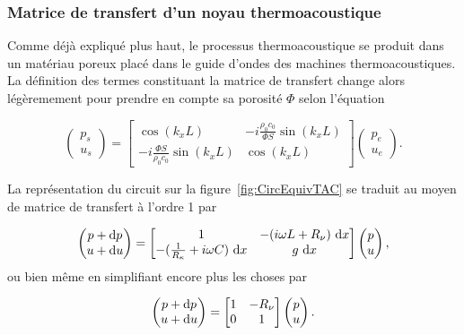 \subsubsection{Matrice de transfert d'un noyau thermoacoustique}

Comme déjà expliqué plus haut, le processus thermoacoustique se produit dans un matériau poreux placé dans le guide d'ondes des machines thermoacoustiques. La définition des termes constituant la matrice de transfert change alors légèremement pour prendre en compte sa porosité $\Phi$ selon l'équation

\begin{equation}
\begin{pmatrix}
p_s\\
u_s
\end{pmatrix} = \begin{bmatrix}
\cos(k_x L) & -i\frac{\rho_0 c_0}{\Phi S}\sin(k_x L)\\
-i\frac{\Phi S}{\rho_0 c_0}\sin(k_x L) & \cos(k_x L)
\end{bmatrix}
\begin{pmatrix}
p_e\\
u_e
\end{pmatrix}.\label{eq:Tmatrix_poreux}
\end{equation}


La représentation du circuit sur la figure~\ref{fig:CircEquivTAC} se traduit au moyen de matrice de transfert à l'ordre 1 par 


\begin{equation}
	\begin{pmatrix}
		p + \mathrm{d} p\\
		u + \mathrm{d} u
	\end{pmatrix} = \begin{bmatrix}
	1 & -(i\omega L + R_\nu)~\mathrm{d} x  \\
	-(\frac{1}{R_\kappa} + i \omega C)~\mathrm{d} x & g~\mathrm{d} x \end{bmatrix} \begin{pmatrix}
	p \\
	u
	\end{pmatrix}, \label{eq:TMatrix_NoyauTA}
\end{equation}
ou bien même en simplifiant encore plus les choses par

\begin{equation}
    \begin{pmatrix}
        p + \mathrm{d} p \\
        u + \mathrm{d} u
    \end{pmatrix} = \begin{bmatrix}
    1 & -R_\nu \\
    0 & 1
    \end{bmatrix}\begin{pmatrix}
        p \\
        u
    \end{pmatrix}.
    \label{eq:Tmatrix_NoyauTA_simplifie}
\end{equation}

